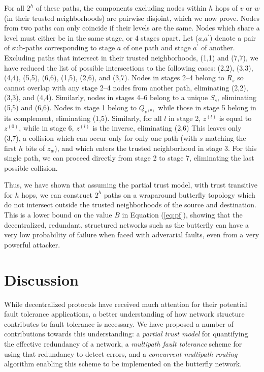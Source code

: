\documentclass{sig-alternate-05-2015}
\begin{document}
For all $2^h$ of these paths, the components excluding nodes within $h$ hops
of $v$ or $w$ (in their trusted neighborhoods) are pairwise disjoint,
which we now prove.
Nodes from two paths can only coincide if their levels are the same.
Nodes which share a level must either be in the same stage, or 4 stages
apart.
Let ($a$,$a^\prime$) denote a pair of sub-paths corresponding to stage $a$ of
one path and stage $a^\prime$ of another.
Excluding paths that intersect in their trusted neighborhoods, (1,1) and (7,7),
we have reduced the list of possible intersections to the following cases:
(2,2), (3,3), (4,4), (5,5), (6,6), (1,5), (2,6), and (3,7).
Nodes in stages 2--4 belong to $R_s$ so cannot overlap with any stage 2--4
nodes from another path, eliminating (2,2), (3,3), and (4,4).
Similarly, nodes in stages 4--6 belong to a unique $S_s$,
eliminating (5,5) and (6,6).
Nodes in stage 1 belong to $Q_{v^{(0)}}$ while those in stage 5 belong in
its complement, eliminating (1,5).
Similarly, for all $l$ in stage 2, $z^{(l)}$ is equal to $z^{(0)}$,
while in stage 6, $z^{(l)}$ is the inverse, eliminating (2,6)
This leaves only (3,7), a collision which can occur only for only one path
(with $s$ matching the first $h$ bits of $z_w$), and which enters the trusted
neighborhood in stage 3.
For this single path, we can proceed directly from stage 2 to stage 7,
eliminating the last possible collision.

Thus, we have shown that assuming the partial trust model, with trust transitive
for $h$ hops, we can construct $2^h$ paths on a wraparound butterfly topology
which do not intersect outside the trusted neighborhoods of the source and
destination.
This is a lower bound on the value $B$ in Equation (\ref{eq:pf}),
showing that the decentralized, redundant, structured networks such as the
butterfly can have a very low probability of failure when faced with
adverarial faults, even from a very powerful attacker.

\section{Discussion}

While decentralized protocols have received much attention for their potential
fault tolerance applications,
a better understanding of how network structure contributes to fault tolerance
is necessary.
We have proposed a number of contributions towards this understanding:
a {\em partial trust model} for quantifying the effective redundancy
of a network,
a {\em multipath fault tolerance} scheme for using that redundancy to detect
errors,
and a {\em concurrent multipath routing} algorithm enabling this scheme to
be implemented on the butterfly network.
\end{document}

